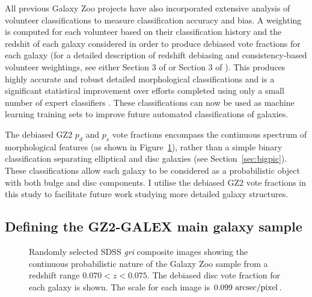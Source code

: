 All previous Galaxy Zoo projects have also incorporated extensive analysis of volunteer classifications to measure classification accuracy and bias. A weighting is computed for each volunteer based on their classification history and the redshit of each galaxy considered in order to produce debiased vote fractions for each galaxy (for a detailed description of redshift debiasing and consistency-based volunteer weightings, see either Section 3 of \citealt{Lintott09} or Section 3 of \citealt{GZ2}). This produces highly accurate and robust detailed morphological classifications and is a significant statistical improvement over efforts completed using only a small number of expert classifiers \citep{schawinski07, nair10b, ann15}. These classifications can now be used as machine learning training sets \citep{dieleman15} to improve future automated classifications of galaxies. 

The debiased GZ2 $p_d$ and $p_s$ vote fractions encompass the continuous spectrum of morphological features (as shown in Figure~\ref{fig:mosaic}), rather than a simple binary classification separating elliptical and disc galaxies (see Section~\ref{sec:bigpic}). These classifications allow each galaxy to be considered as a probabilistic object with both bulge and disc components. I utilise the debiased GZ2 vote fractions in this study to facilitate future work studying more detailed galaxy structures. 

\subsection{Defining the GZ2-GALEX main galaxy sample}\label{sec:defsample}

\begin{figure}
\caption[Example SDSS images with GZ2 vote fractions]{Randomly selected SDSS \emph{gri} composite images showing the continuous probabilistic nature of the Galaxy Zoo sample from a redshift range $0.070 < z < 0.075$. The debiased disc vote fraction for each galaxy is shown. The scale for each image is $0.099~\rm{arcsec/pixel}$.}
\label{fig:mosaic}
\end{figure}

